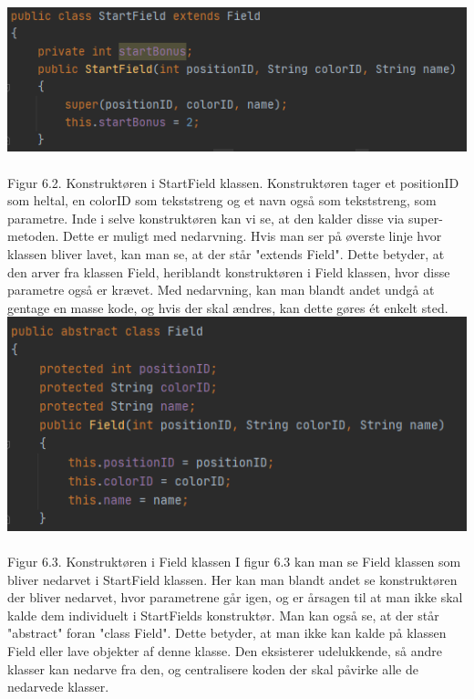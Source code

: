 \begin{flushleft}
\newpage
\includegraphics[width=1\textwidth]{Report/figures/StartField constructor.PNG}~\\[0cm] 
Figur 6.2. Konstruktøren i StartField klassen.
\addlinespace
Konstruktøren tager et positionID som heltal, en colorID som tekststreng og et navn også som tekststreng, som parametre.
Inde i selve konstruktøren kan vi se, at den kalder disse via super-metoden. 
Dette er muligt med nedarvning. Hvis man ser på øverste linje hvor klassen bliver lavet, kan man se, at der står "extends Field".
Dette betyder, at den arver fra klassen Field, heriblandt konstruktøren i Field klassen, hvor disse parametre også er krævet.
Med nedarvning, kan man blandt andet undgå at gentage en masse kode, og hvis der skal ændres, kan dette gøres ét enkelt sted.
\newpage
\includegraphics[width=1\textwidth]{Report/figures/Field constructor.PNG}~\\[0cm] 
Figur 6.3. Konstruktøren i Field klassen
\addlinespace
I figur 6.3 kan man se Field klassen som bliver nedarvet i StartField klassen. Her kan man blandt andet se konstruktøren der bliver nedarvet, hvor parametrene går igen, og er årsagen til at man ikke skal kalde dem individuelt i StartFields konstruktør.
Man kan også se, at der står "abstract" foran "class Field". Dette betyder, at man ikke kan kalde på klassen Field eller lave objekter af denne klasse.
Den eksisterer udelukkende, så andre klasser kan nedarve fra den, og centralisere koden der skal påvirke alle de nedarvede klasser.
\end{flushleft}